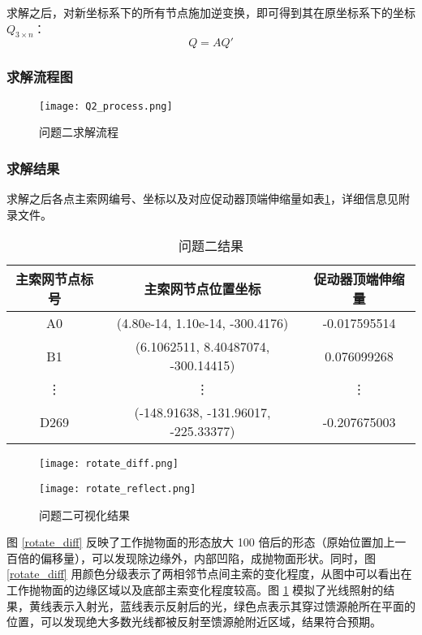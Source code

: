 \documentclass[withoutpreface,bwprint,fontset=macnew]{cumcmthesis} %
\begin{document}
		求解之后，对新坐标系下的所有节点施加逆变换，即可得到其在原坐标系下的坐标 $Q_{3\times n}$：
		$$
		Q = A Q'
		$$
	
	\subsubsection {求解流程图}
		\begin{figure}[!h]
			\centering
			\texttt{[image: Q2\_process.png]} %
			\caption{问题二求解流程}
		\end{figure}
	
	\subsubsection {求解结果}
		求解之后各点主索网编号、坐标以及对应促动器顶端伸缩量如表\ref{tab:resultT2}，详细信息见附录文件。
	
		\begin{table}[!htbp]
			\centering
			\caption{问题二结果}
			\label{tab:resultT2}
			\begin{tabular}{ccc}
				\toprule[1.5pt]
				主索网节点标号 & 主索网节点位置坐标 & 促动器顶端伸缩量\\
				\midrule[1pt]
				A0 & (4.80e-14, 1.10e-14, -300.4176) & -0.017595514\\
				B1 & (6.1062511, 8.40487074, -300.14415) & 0.076099268\\
				\vdots & \vdots & \vdots\\
				D269 & (-148.91638, -131.96017, -225.33377) & -0.207675003\\
				\bottomrule[1.5pt]
			\end{tabular}
		\end{table}
		
		\begin{figure}[!h]
			\centering
			\begin{minipage}[c]{0.48\textwidth}
				\centering
				\texttt{[image: rotate\_diff.png]}
				\label{rotate_diff}
			\end{minipage}
			\begin{minipage}[c]{0.48\textwidth}
				\centering
				\texttt{[image: rotate\_reflect.png]}
				\label{rotate_reflect}
			\end{minipage}
			\caption{问题二可视化结果}
		\end{figure}

		图 \ref{rotate_diff} 反映了工作抛物面的形态放大 100 倍后的形态（原始位置加上一百倍的偏移量），可以发现除边缘外，内部凹陷，成抛物面形状。同时，图 \ref{rotate_diff} 用颜色分级表示了两相邻节点间主索的变化程度，从图中可以看出在工作抛物面的边缘区域以及底部主索变化程度较高。图 \ref{rotate_reflect} 模拟了光线照射的结果，黄线表示入射光，蓝线表示反射后的光，绿色点表示其穿过馈源舱所在平面的位置，可以发现绝大多数光线都被反射至馈源舱附近区域，结果符合预期。
		
\end{document}
